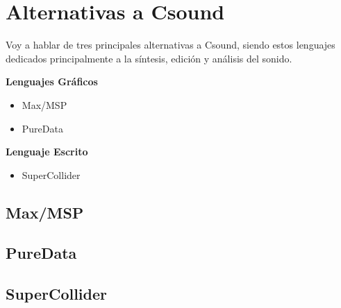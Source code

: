 \section{Alternativas a Csound}\label{sec:intro}

Voy a hablar de tres principales alternativas a Csound, siendo estos lenguajes dedicados principalmente a la síntesis, edición y análisis del sonido.\bigskip

\textbf{Lenguajes Gráficos} 
\begin{itemize}
 \item Max/MSP
 \item PureData
\end{itemize}
\bigskip

\textbf{Lenguaje Escrito} 
\begin{itemize}
 \item SuperCollider
\end{itemize}

\subsection{Max/MSP}

\subsection{PureData}

\subsection{SuperCollider}

 

